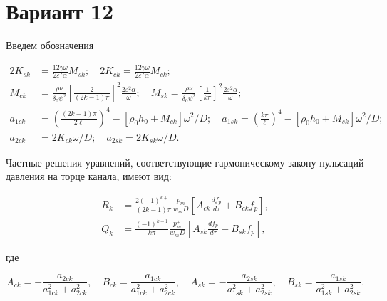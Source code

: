 \documentclass{article}
\begin{document}
\section*{Вариант 12}

Введем обозначения

\[
\begin{aligned}
2K_{sk} &= \frac{12\gamma\omega}{2\varepsilon^2\alpha} M_{sk}; \quad 
2K_{ck} = \frac{12\gamma\omega}{2\varepsilon^2\alpha} M_{ck}; \\
M_{ck} &= \frac{\rho\nu}{\delta_0\psi^2} \left[ \frac{2}{(2k-1)\pi} \right]^2 \frac{2\varepsilon^2\alpha}{\omega}; \quad 
M_{sk} = \frac{\rho\nu}{\delta_0\psi^2} \left[ \frac{1}{k\pi} \right]^2 \frac{2\varepsilon^2\alpha}{\omega}; \\
a_{1ck} &= \left(\frac{(2k-1)\pi}{2\ell}\right)^4 - [\rho_0h_0 + M_{ck}]\omega^2/D; \quad 
a_{1sk} = \left(\frac{k\pi}{\ell}\right)^4 - [\rho_0h_0 + M_{sk}]\omega^2/D; \\
a_{2ck} &= 2K_{ck}\omega/D; \quad 
a_{2sk} = 2K_{sk}\omega/D.
\end{aligned}
\]

Частные решения уравнений, соответствующие гармоническому закону пульсаций давления на торце канала, имеют вид:

\[
\begin{aligned}
R_k &= \frac{2(-1)^{k+1}}{(2k-1)\pi} \frac{p_m^+}{w_m D} \left[ A_{ck} \frac{df_p}{d\tau} + B_{ck} f_p \right], \\
Q_k &= \frac{(-1)^{k+1}}{k\pi} \frac{p_m^+}{w_m D} \left[ A_{sk} \frac{df_p}{d\tau} + B_{sk} f_p \right],
\end{aligned}
\]

где

\[
A_{ck} = -\frac{a_{2ck}}{a_{1ck}^2 + a_{2ck}^2}, \quad 
B_{ck} = \frac{a_{1ck}}{a_{1ck}^2 + a_{2ck}^2}, \quad 
A_{sk} = -\frac{a_{2sk}}{a_{1sk}^2 + a_{2sk}^2}, \quad 
B_{sk} = \frac{a_{1sk}}{a_{1sk}^2 + a_{2sk}^2}.
\]
\end{document}
